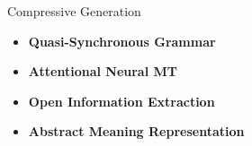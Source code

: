 \documentclass[xcolor={table}]{beamer}
\begin{document}
\begin{frame}{Compressive Generation}

    \begin{itemize}
\item \textbf{Quasi-Synchronous Grammar} 
    {\tiny \cite{woodsend2010generation}}
\item \textbf{Attentional Neural MT}
    {\tiny \cite{rush2015neural}}
    \end{itemize}


    \begin{itemize}
\item \textbf{Open Information Extraction} 
    {\tiny \cite{pighin2014modelling}}
\item \textbf{Abstract Meaning Representation} 
    {\tiny \cite{liu2015toward}}
    \end{itemize}

\end{frame}
 
\end{document}

